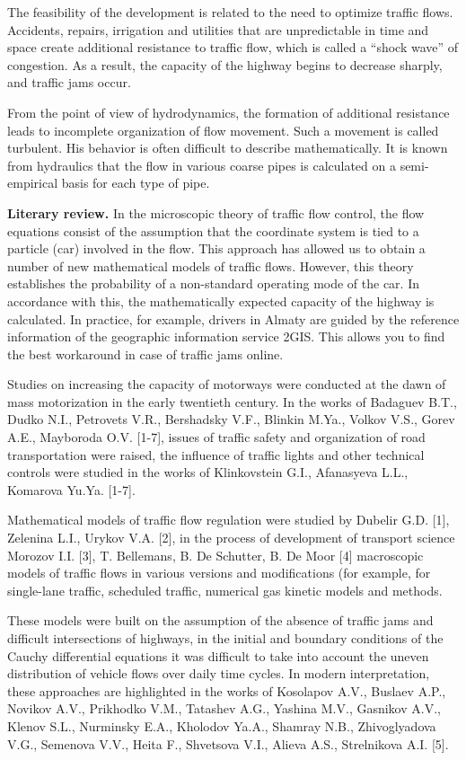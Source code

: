 The feasibility of the development is related to the need to optimize
traffic flows. Accidents, repairs, irrigation and utilities that are
unpredictable in time and space create additional resistance to traffic
flow, which is called a ``shock wave'' of congestion. As a result, the
capacity of the highway begins to decrease sharply, and traffic jams
occur.

From the point of view of hydrodynamics, the formation of additional
resistance leads to incomplete organization of flow movement. Such a
movement is called turbulent. His behavior is often difficult to
describe mathematically. It is known from hydraulics that the flow in
various coarse pipes is calculated on a semi-empirical basis for each
type of pipe.

\textbf{Literary review.} In the microscopic theory of traffic flow
control, the flow equations consist of the assumption that the
coordinate system is tied to a particle (car) involved in the flow. This
approach has allowed us to obtain a number of new mathematical models of
traffic flows. However, this theory establishes the probability of a
non-standard operating mode of the car. In accordance with this, the
mathematically expected capacity of the highway is calculated. In
practice, for example, drivers in Almaty are guided by the reference
information of the geographic information service 2GIS. This allows you
to find the best workaround in case of traffic jams online.

Studies on increasing the capacity of motorways were conducted at the
dawn of mass motorization in the early twentieth century. In the works
of Badaguev B.T., Dudko N.I., Petrovets V.R., Bershadsky V.F., Blinkin
M.Ya., Volkov V.S., Gorev A.E., Mayboroda O.V. {[}1-7{]}, issues of
traffic safety and organization of road transportation were raised, the
influence of traffic lights and other technical controls were studied in
the works of Klinkovstein G.I., Afanasyeva L.L., Komarova Yu.Ya.
{[}1-7{]}.

Mathematical models of traffic flow regulation were studied by Dubelir
G.D. {[}1{]}, Zelenina L.I., Urykov V.A. {[}2{]}, in the process of
development of transport science Morozov I.I. {[}3{]}, T. Bellemans, B.
De Schutter, B. De Moor {[}4{]} macroscopic models of traffic flows in
various versions and modifications (for example, for single-lane
traffic, scheduled traffic, numerical gas kinetic models and methods.

These models were built on the assumption of the absence of traffic jams
and difficult intersections of highways, in the initial and boundary
conditions of the Cauchy differential equations it was difficult to take
into account the uneven distribution of vehicle flows over daily time
cycles. In modern interpretation, these approaches are highlighted in
the works of Kosolapov A.V., Buslaev A.P., Novikov A.V., Prikhodko V.M.,
Tatashev A.G., Yashina M.V., Gasnikov A.V., Klenov S.L., Nurminsky E.A.,
Kholodov Ya.A., Shamray N.B., Zhivoglyadova V.G., Semenova V.V., Heita
F., Shvetsova V.I., Alieva A.S., Strelnikova A.I. {[}5{]}.

